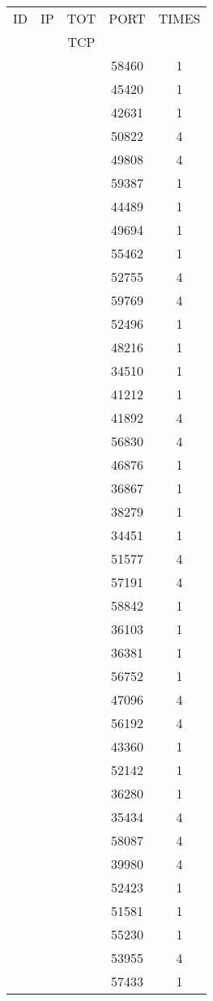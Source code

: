 \documentclass[a4paper]{scrartcl}
\begin{document}
\begin{minipage}[b]{0.5\linewidth}
\begin{tabular}{| c | c | c | c | c |}
\hline
ID & IP & TOT & PORT & TIMES \\ 
   &    & TCP &      &       \\ 
\hline
& & & 58460 & 1 \\ & & & 45420 & 1 \\ & & & 42631 & 1 \\ & & & 50822 & 4 \\ & & & 49808 & 4 \\ & & & 59387 & 1 \\ & & & 44489 & 1 \\ & & & 49694 & 1 \\ & & & 55462 & 1 \\ & & & 52755 & 4 \\ & & & 59769 & 4 \\ & & & 52496 & 1 \\ & & & 48216 & 1 \\ & & & 34510 & 1 \\ & & & 41212 & 1 \\ & & & 41892 & 4 \\ & & & 56830 & 4 \\ & & & 46876 & 1 \\ & & & 36867 & 1 \\ & & & 38279 & 1 \\ & & & 34451 & 1 \\ & & & 51577 & 4 \\ & & & 57191 & 4 \\ & & & 58842 & 1 \\ & & & 36103 & 1 \\ & & & 36381 & 1 \\ & & & 56752 & 1 \\ & & & 47096 & 4 \\ & & & 56192 & 4 \\ & & & 43360 & 1 \\ & & & 52142 & 1 \\ & & & 36280 & 1 \\ & & & 35434 & 4 \\ & & & 58087 & 4 \\ & & & 39980 & 4 \\ & & & 52423 & 1 \\ & & & 51581 & 1 \\ & & & 55230 & 1 \\ & & & 53955 & 4 \\ & & & 57433 & 1 \\ \hline\end{tabular}\end{minipage} \hfill\begin{minipage}[b]{0.5\linewidth}\begin{tabular}{| c | c | c | c | c |}

\end{tabular}
\end{minipage}
\end{document}

